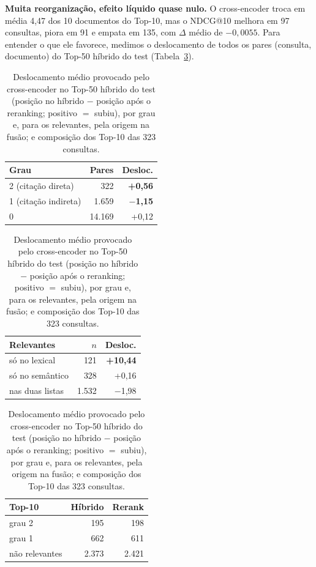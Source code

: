 \documentclass[10pt,a4paper]{article}
\begin{document}
\textbf{Muita reorganização, efeito líquido quase nulo.} O cross-encoder troca em média 4,47 dos 10 documentos do Top-10, mas o NDCG@10 melhora em 97 consultas, piora em 91 e empata em 135, com $\Delta$ médio de $-0{,}0055$. Para entender o que ele favorece, medimos o deslocamento de todos os pares (consulta, documento) do Top-50 híbrido do test (Tabela~\ref{tab:desloc}).

\begin{table}[!htb]
\centering\small
\caption{Deslocamento médio provocado pelo cross-encoder no Top-50 híbrido do test (posição no híbrido $-$ posição após o reranking; positivo $=$ subiu), por grau e, para os relevantes, pela origem na fusão; e composição dos Top-10 das 323 consultas.}
\label{tab:desloc}
\begin{minipage}[t]{0.33\linewidth}\centering
\begin{tabular}[t]{@{}lrr@{}}
\toprule
Grau & Pares & Desloc. \\
\midrule
2 (citação direta) & 322 & \textbf{+0,56} \\
1 (citação indireta) & 1.659 & \textbf{$-$1,15} \\
0 & 14.169 & +0,12 \\
\bottomrule
\end{tabular}
\end{minipage}\hfill
\begin{minipage}[t]{0.33\linewidth}\centering
\begin{tabular}[t]{@{}lrr@{}}
\toprule
Relevantes & $n$ & Desloc. \\
\midrule
só no lexical & 121 & \textbf{+10,44} \\
só no semântico & 328 & +0,16 \\
nas duas listas & 1.532 & $-$1,98 \\
\bottomrule
\end{tabular}
\end{minipage}\hfill
\begin{minipage}[t]{0.30\linewidth}\centering
\begin{tabular}[t]{@{}lrr@{}}
\toprule
Top-10 & Híbrido & Rerank \\
\midrule
grau 2 & 195 & 198 \\
grau 1 & 662 & 611 \\
não relevantes & 2.373 & 2.421 \\
\bottomrule
\end{tabular}
\end{minipage}
\end{table}
\end{document}
